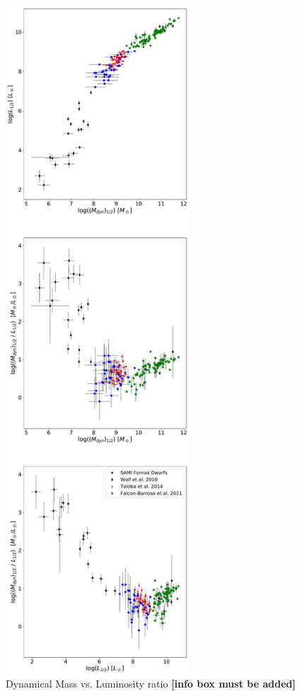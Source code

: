 \documentclass{aa}
\begin{document}
\begin{figure}[!htb]
   \centering
   \includegraphics[height=25cm]{../2_pipeline/2_MassDyn_Luminosity+Liter/DyM-L+Liter_DWARF.pdf}   		
  	 \caption{Dynamical Mass vs. Luminosity ratio \textbf{[info box must be added]}}
         \label{fig:ML}
\end{figure}
\end{document}
